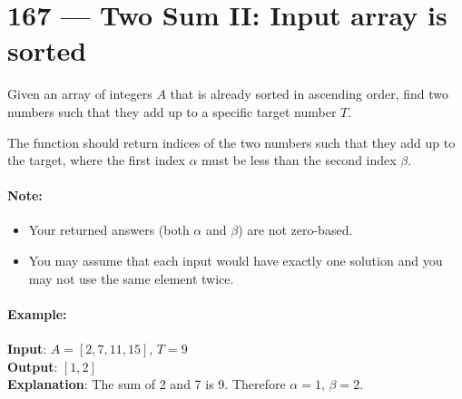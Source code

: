 \section{167 --- Two Sum II: Input array is sorted}
Given an array of integers $A$ that is already sorted in ascending order, find two numbers such that they add up to a specific target number $T$.
\par
The function should return indices of the two numbers such that they add up to the target, where the first index $\alpha$ must be less than the second index $\beta$.
\paragraph{Note:}
\begin{itemize}
    \item Your returned answers (both $\alpha$ and $\beta$) are not zero-based.
    \item You may assume that each input would have exactly one solution and you may not use the same element twice.
\end{itemize}
\paragraph{Example:}
\begin{flushleft}
\textbf{Input}: $A = [2,7,11,15]$, $T = 9$
\\
\textbf{Output}: $[1,2]$
\\
\textbf{Explanation}: The sum of 2 and 7 is 9. Therefore $\alpha = 1$, $\beta = 2$.
\end{flushleft}
